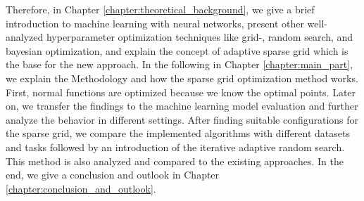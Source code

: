 Therefore, in Chapter \ref{chapter:theoretical_background}, we give a brief introduction to machine learning with neural networks, present other well-analyzed hyperparameter optimization techniques like grid-, random search, and bayesian optimization, and explain the concept of adaptive sparse grid which is the base for the new approach. In the following in Chapter \ref{chapter:main_part}, we explain the Methodology and how the sparse grid optimization method works. First, normal functions are optimized because we know the optimal points. Later on, we transfer the findings to the machine learning model evaluation and further analyze the behavior in different settings. After finding suitable configurations for the sparse grid, we compare the implemented algorithms with different datasets and tasks followed by an introduction of the iterative adaptive random search. This method is also analyzed and compared to the existing approaches. In the end, we give a conclusion and outlook in Chapter \ref{chapter:conclusion_and_outlook}.


